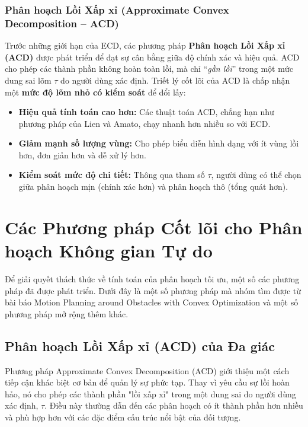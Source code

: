 \documentclass{article}
\begin{document}
\subsubsection{Phân hoạch Lồi Xấp xỉ (Approximate Convex Decomposition – ACD)}

Trước những giới hạn của ECD, các phương pháp \textbf{Phân hoạch Lồi Xấp xỉ (ACD)} được phát triển để đạt sự cân bằng giữa độ chính xác và hiệu quả.  
ACD cho phép các thành phần không hoàn toàn lồi, mà chỉ “\textit{gần lồi}” trong một mức dung sai lõm $\tau$ do người dùng xác định.  
Triết lý cốt lõi của ACD là chấp nhận một \textbf{mức độ lõm nhỏ có kiểm soát} để đổi lấy:
\begin{itemize}
    \item \textbf{Hiệu quả tính toán cao hơn:} Các thuật toán ACD, chẳng hạn như phương pháp của Lien và Amato, chạy nhanh hơn nhiều so với ECD.
    \item \textbf{Giảm mạnh số lượng vùng:} Cho phép biểu diễn hình dạng với ít vùng lồi hơn, đơn giản hơn và dễ xử lý hơn.
    \item \textbf{Kiểm soát mức độ chi tiết:} Thông qua tham số $\tau$, người dùng có thể chọn giữa phân hoạch mịn (chính xác hơn) và phân hoạch thô (tổng quát hơn). 
\end{itemize}  


\section{Các Phương pháp Cốt lõi cho Phân hoạch Không gian Tự do}

Để giải quyết thách thức về tính toán của phân hoạch tối ưu, một số các phương pháp đã được phát triển. Dưới đây là một số phương pháp mà nhóm tìm được từ bài báo Motion Planning around Obstacles with Convex Optimization và một số phương pháp mở rộng thêm khác.

\subsection{Phân hoạch Lồi Xấp xỉ (ACD) của Đa giác} 

Phương pháp Approximate Convex Decomposition (ACD) giới thiệu một cách tiếp cận khác biệt cơ bản để quản lý sự phức tạp. Thay vì yêu cầu sự lồi hoàn hảo, nó cho phép các thành phần "lồi xấp xỉ" trong một dung sai do người dùng xác định, $\tau$.\cite{lien2006} Điều này thường dẫn đến các phân hoạch có ít thành phần hơn nhiều và phù hợp hơn với các đặc điểm cấu trúc nổi bật của đối tượng.
\end{document}
